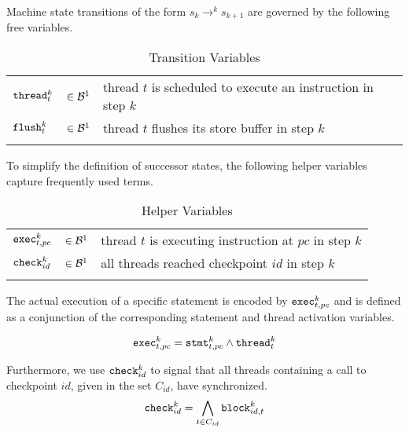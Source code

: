 \bigskip

Machine state transitions of the form $s_k \to^k s_{k + 1}$ are governed by the following free variables.

\begin{longtabu}{llX}
  \firsthline
  $\THREAD^k_t$ & $\in \BVSORT[1]$ & thread $t$ is scheduled to execute an instruction in step $k$ \\
  $\FLUSH^k_t$ & $\in \BVSORT[1]$ & thread $t$ flushes its store buffer in step $k$ \\
  \lasthline
  \caption{Transition Variables}
  \label{tbl:encoding:transitions}
\end{longtabu}

To simplify the definition of successor states, the following helper variables capture frequently used terms.

\begin{longtabu}{llX}
  \firsthline
  $\EXEC^k_{t, pc}$ & $\in \BVSORT[1]$ & thread $t$ is executing instruction at $pc$ in step $k$ \\
  $\CHECK^k_{id}$ & $\in \BVSORT[1]$ & all threads reached checkpoint $id$ in step $k$ \\
  \lasthline
  \caption{Helper Variables}
\end{longtabu}

The actual execution of a specific statement is encoded by $\EXEC^k_{t, pc}$ and
is defined as a conjunction of the corresponding statement and thread activation variables.

\[
  \EXEC^k_{t, pc} = \STMT^k_{t, pc} \land \THREAD^k_t
\]

Furthermore, we use $\CHECK^k_{id}$ to signal that all threads containing a call to checkpoint $id$, given in the set $C_{id}$, have synchronized.%
\[
  \CHECK^k_{id} = \bigwedge_{t \in C_{id}} \BLOCK^k_{id, t}
\]

